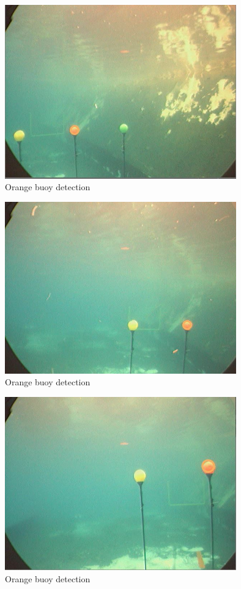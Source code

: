 \documentclass[12pt]{article}
\begin{document}
\begin{figure}[h]
    \centering
    \includegraphics[width=10cm]{orangebuoydetection}
    \caption{Orange buoy detection}
    \label{fig:Orange buoy detection}
\end{figure}
\newpage
\begin{figure}[h]
    \centering
    \includegraphics[width=10cm]{orangebuoydetection1}
    \caption{Orange buoy detection}
    \label{fig:Orange buoy detection}
\end{figure}
\begin{figure}[h]
    \centering
    \includegraphics[width=10cm]{orangebuoydetection2}
    \caption{Orange buoy detection}
    \label{fig:Orange buoy detection}
\end{figure}
\end{document}
